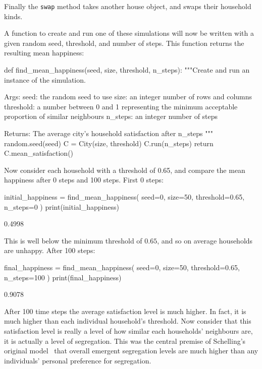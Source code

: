 Finally the \texttt{swap} method takes another house object, and
swaps their household kinds.

A function to create and run one of these simulations will now be written
with a given random seed, threshold, and number of steps. This function returns
the resulting mean happiness:

\begin{pyin}
def find_mean_happiness(seed, size, threshold, n_steps):
    """Create and run an instance of the simulation.

    Args:
        seed: the random seed to use
        size: an integer number of rows and columns
        threshold: a number between 0 and 1 representing
            the minimum acceptable proportion of similar
            neighbours
        n_steps: an integer number of steps

    Returns:
        The average city's household satisfaction after
        n_steps
    """
    random.seed(seed)
    C = City(size, threshold)
    C.run(n_steps)
    return C.mean_satisfaction()
\end{pyin}

Now consider each household with a threshold of
0.65, and compare the mean happiness after 0 steps and 100 steps.
First 0 steps:

\begin{pyin}
initial_happiness = find_mean_happiness(
    seed=0, size=50, threshold=0.65, n_steps=0
)
print(initial_happiness)
\end{pyin}

\begin{pyout}
0.4998
\end{pyout}

This is well below the minimum threshold of \(0.65\), and so on average
households are unhappy.
After 100 steps:

\begin{pyin}
final_happiness = find_mean_happiness(
    seed=0, size=50, threshold=0.65, n_steps=100
)
print(final_happiness)
\end{pyin}

\begin{pyout}
0.9078
\end{pyout}

After 100 time steps the average satisfaction level is much higher.
In fact, it is much higher than each individual household's threshold.
Now consider that this satisfaction level is really a level of how similar
each households' neighbours are, it is actually a level of segregation.
This was the central premise of Schelling's original
model~\cite{schelling2006micromotives}
that overall
emergent segregation levels are much higher than any individuals' personal
preference for segregation.


